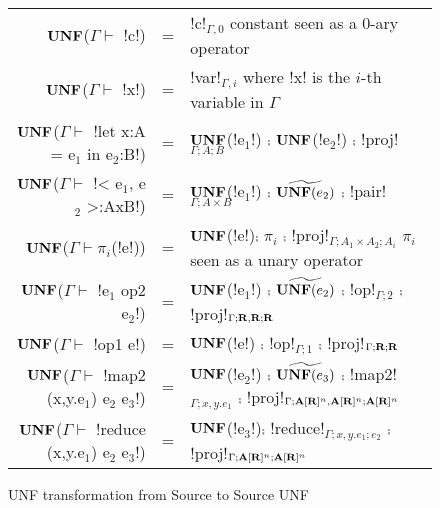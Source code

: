 \begin{figure*}[t]
    \begin{tabular}{r c l}
    $\mathbf{UNF}$($\Gamma\vdash $ !c!) &=& !c!$_{\Gamma,0}$ constant seen as a 0-ary operator\\
    $\mathbf{UNF}$($\Gamma\vdash $ !x!) &=& !var!$_{\Gamma,i}$ where !x! is the $i$-th variable in $\Gamma$ \\
    $\mathbf{UNF}$($\Gamma\vdash $ !let x:A = e$_1$ in e$_2$:B!) &=& $\mathbf{UNF}$(!e$_1$!) $\comp$ $\mathbf{UNF}$(!e$_2$!) $\comp$ !proj!$_{\Gamma;A;B}$  \\ 
    $\mathbf{UNF}$($\Gamma\vdash $ !< e$_1$, e$_2$ >:AxB!) &=& $\mathbf{UNF}$(!e$_1$!) $\comp$ $\widetilde{\mathbf{UNF}(e_2)}$ $\comp$ !pair!$_{\Gamma;A\times B}$ \\ 
    $\mathbf{UNF}$($\Gamma\vdash \pi_i$(!e!)) &=& $\mathbf{UNF}$(!e!)$\comp $ $\pi_i$ $\comp$ !proj!$_{\Gamma;A_1\times A_2;A_i}$ $\pi_i$ seen as a unary operator\\
    $\mathbf{UNF}$($\Gamma\vdash $ !e$_1$ op2 e$_2$!) &=& $\mathbf{UNF}$(!e$_1$!) $\comp$ $\widetilde{\mathbf{UNF}(e_2)}$ $\comp$ !op!$_{\Gamma;2}$ $\comp$ !proj!$_{\Gamma;\mathbf{R},\mathbf{R};\mathbf{R}}$ \\
    $\mathbf{UNF}$($\Gamma\vdash $ !op1 e!) &=& $\mathbf{UNF}$(!e!) $\comp$ !op!$_{\Gamma;1}$ $\comp$ !proj!$_{\Gamma;\mathbf{R};\mathbf{R}}$ \\
    $\mathbf{UNF}$($\Gamma\vdash $ !map2 (x,y.e$_1$) e$_2$ e$_3$!) &=& $\mathbf{UNF}$(!e$_2$!) $\comp$ $\widetilde{\mathbf{UNF}(e_3)}$ $\comp$ !map2!$_{\Gamma; x,y.e_1}$ $\comp$ !proj!$_{\Gamma;\mathbf{A}[\mathbf{R}]^{n},\mathbf{A}[\mathbf{R}]^{n};\mathbf{A}[\mathbf{R}]^{n}}$ \\ 
    $\mathbf{UNF}$($\Gamma\vdash $ !reduce (x,y.e$_1$) e$_2$ e$_3$!) &=& $\mathbf{UNF}$(!e$_3$!)$\comp$ !reduce!$_{\Gamma; x,y.e_1; e_2}$ $\comp$ !proj!$_{\Gamma;\mathbf{A}[\mathbf{R}]^{n};\mathbf{A}[\mathbf{R}]^{n}}$ \\ 
    \end{tabular}
    \caption{UNF transformation from Source to Source UNF}
    \label{fig:source_to_unf}
    \end{figure*}